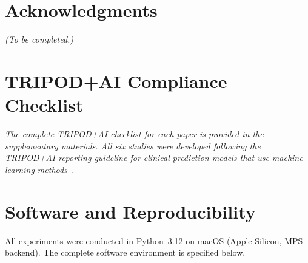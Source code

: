 \documentclass[12pt,oneside]{report}
\begin{document}
\chapter*{Acknowledgments}
\textit{(To be completed.)}

\tableofcontents
\listoffigures
\listoftables




















\appendix

\chapter{TRIPOD+AI Compliance Checklist}
\label{app:tripod}
\textit{The complete TRIPOD+AI checklist for each paper is provided in the
supplementary materials. All six studies were developed following the TRIPOD+AI
reporting guideline for clinical prediction models that use machine learning
methods~\cite{collins2024}.}

\chapter{Software and Reproducibility}
\label{app:software}

All experiments were conducted in Python~3.12 on macOS (Apple Silicon, MPS
backend). The complete software environment is specified below.
\end{document}

